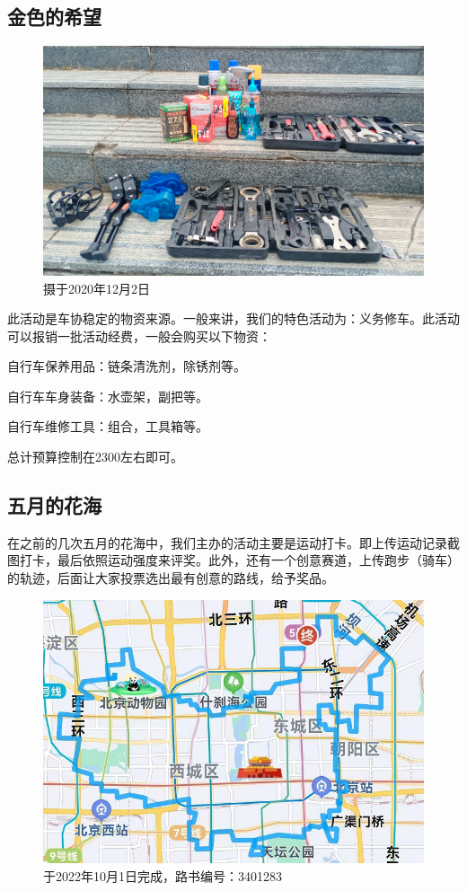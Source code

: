 \documentclass{ctexbook}
\begin{document}
\subsection{金色的希望}
\begin{figure}[htp]
    \centering
    \includegraphics[width=0.7\linewidth]{fig/金色的希望}
    \caption{摄于2020年12月2日}
    \label{fig:}
\end{figure}

此活动是车协稳定的物资来源。一般来讲，我们的特色活动为：义务修车。此活动可以报销一批活动经费，一般会购买以下物资：

自行车保养用品：链条清洗剂，除锈剂等。

自行车车身装备：水壶架，副把等。

自行车维修工具：组合，工具箱等。

总计预算控制在2300左右即可。
\subsection{五月的花海}
在之前的几次五月的花海中，我们主办的活动主要是运动打卡。即上传运动记录截图打卡，最后依照运动强度来评奖。此外，还有一个创意赛道，上传跑步（骑车）的轨迹，后面让大家投票选出最有创意的路线，给予奖品。

\begin{figure}[H]
    \centering
    \includegraphics[width=0.7\linewidth]{fig/地图路线.png}
    \caption{于2022年10月1日完成，路书编号：3401283}
    \label{fig:百团大战}
\end{figure}
\end{document}
